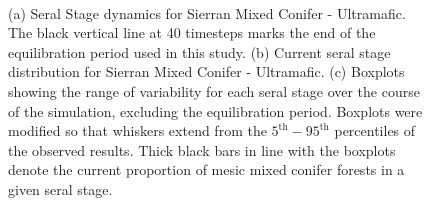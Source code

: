 \begin{figure}[!htbp]
  \centering
  \\
  \caption{(a) Seral Stage dynamics for Sierran Mixed Conifer - Ultramafic. The black vertical line at 40 timesteps marks the end of the equilibration period used in this study. (b) Current seral stage distribution for Sierran Mixed Conifer - Ultramafic. (c) Boxplots showing the range of variability for each seral stage over the course of the simulation, excluding the equilibration period. Boxplots were modified so that whiskers extend from the $5^{\text{th}} - 95^{\text{th}}$ percentiles of the observed results. Thick black bars in line with the boxplots denote the current proportion of mesic mixed conifer forests in a given seral stage.} 
  \label{fig:covcond_smcu}
\end{figure}

